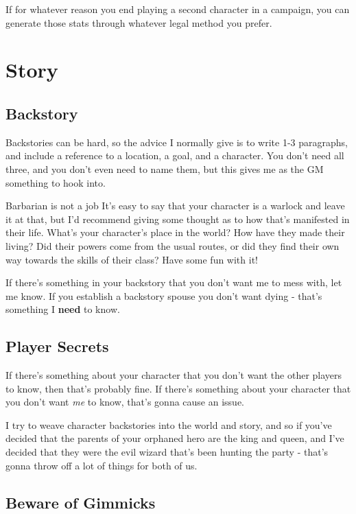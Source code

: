 If for whatever reason you end playing a second character in a campaign, you can generate those stats through whatever legal method you prefer.

\section {Story}

\subsection {Backstory}

Backstories can be hard, so the advice I normally give is to write 1-3 paragraphs, and include a reference to a location, a goal, and a character. You don't need all three, and you don't even need to name them, but this gives me as the GM something to hook into.

\begin{DndComment}{Barbarian is not a job}
  It's easy to say that your character is a warlock and leave it at that, but I'd recommend giving some thought as to how that's manifested in their life. What's your character's place in the world? How have they made their living? Did their powers come from the usual routes, or did they find their own way towards the skills of their class? Have some fun with it!
\end{DndComment}

If there's something in your backstory that you don't want me to mess with, let me know. If you establish a backstory spouse you don't want dying - that's something I \textbf{need} to know.

\subsection {Player Secrets}

If there's something about your character that you don't want the other players to know, then that's probably fine. If there's something about your character that you don't want \textit{me} to know, that's gonna cause an issue.

I try to weave character backstories into the world and story, and so if you've decided that the parents of your orphaned hero are the king and queen, and I've decided that they were the evil wizard that's been hunting the party - that's gonna throw off a lot of things for both of us.


\subsection {Beware of Gimmicks}

